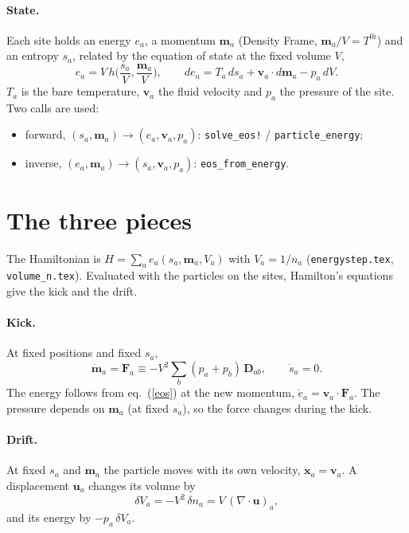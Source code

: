 \documentclass[11pt,aps,preprint,nofootinbib,superscriptaddress,tightenlines]{revtex4-2}
\def\st{\begin{equation}}
\def\stp{\end{equation}}
\def\Eq#1{eq.~(\ref{#1})}
\let\oldparagraph\paragraph
\renewcommand{\paragraph}{\par\bigskip\oldparagraph}
\begin{document}
\paragraph{State.}  Each site holds an energy $e_a$, a momentum $\bm m_a$
(Density Frame, $\bm m_a/V=T^{0i}$) and an entropy $s_a$, related by the equation of
state at the fixed volume $V$,
\st
e_a=V\,h\Big(\frac{s_a}{V},\frac{\bm m_a}{V}\Big),\qquad
de_a=T_a\,ds_a+\bm v_a\cdot d\bm m_a-p_a\,dV .
\label{eos}
\stp
$T_a$ is the bare temperature, $\bm v_a$ the fluid velocity and $p_a$ the pressure of
the site.  Two calls are used:
\begin{itemize}
\item forward, $(s_a,\bm m_a)\to(e_a,\bm v_a,p_a)$: \texttt{solve\_eos!} /
  \texttt{particle\_energy};
\item inverse, $(e_a,\bm m_a)\to(s_a,\bm v_a,p_a)$: \texttt{eos\_from\_energy}.
\end{itemize}

\section{The three pieces}
\label{sec:pieces}

The Hamiltonian is $H=\sum_ae_a(s_a,\bm m_a,V_a)$ with $V_a=1/n_a$
(\texttt{energystep.tex}, \texttt{volume\_n.tex}).  Evaluated with the particles on
the sites, Hamilton's equations give the kick and the drift.

\paragraph{Kick.}  At fixed positions and fixed $s_a$,
\st
\dot{\bm m}_a=\bm F_a\equiv-V^2\sum_b(p_a+p_b)\,\bm D_{ab},\qquad \dot s_a=0 .
\label{kick}
\stp
The energy follows from \Eq{eos} at the new momentum, $\dot e_a=\bm v_a\cdot\bm F_a$.
The pressure depends on $\bm m_a$ (at fixed $s_a$), so the force changes during the
kick.

\paragraph{Drift.}  At fixed $s_a$ and $\bm m_a$ the particle moves with its own
velocity, $\dot{\bm x}_a=\bm v_a$.  A displacement $\bm u_a$ changes its volume by
\st
\delta V_a=-V^2\,\delta n_a=V\,(\nabla\cdot\bm u)_a ,
\stp
and its energy by $-p_a\,\delta V_a$.
\end{document}
